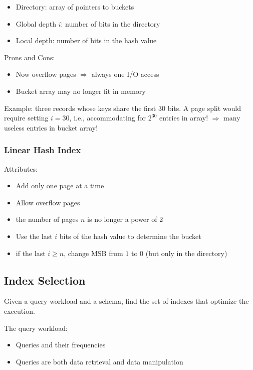 \documentclass[12pt,a4paper]{article}
\begin{document}
\begin{itemize}
    \item Directory: array of pointers to buckets
    \item Global depth $i$: number of bits in the directory
    \item Local depth: number of bits in the hash value
\end{itemize}

Prons and Cons:

\begin{itemize}
    \item Now overflow pages $\Rightarrow$ always one I/O access
    \item Bucket array may no longer fit in memory
\end{itemize}

Example: three records whose keys share the first $30$ bits. 
A page split would require setting $i = 30$, i.e., accommodating for $2^30$ entries in array!
$\Rightarrow$ many useless entries in bucket array!

\subsubsection*{Linear Hash Index}

Attributes:

\begin{itemize}
    \item Add only one page at a time
    \item Allow overflow pages
    \item the number of pages $n$ is no longer a power of 2
    \item Use the last $i$ bits of the hash value to determine the bucket
    \item if the last $i \ge n$, change MSB from $1$ to $0$ (but only in the directory)
\end{itemize}

\subsection*{Index Selection}

Given a query workload and a schema, find the set of indexes that optimize the execution.

The query workload:

\begin{itemize}
    \item Queries and their frequencies
    \item Queries are both data retrieval and data manipulation
\end{itemize}
\end{document}
